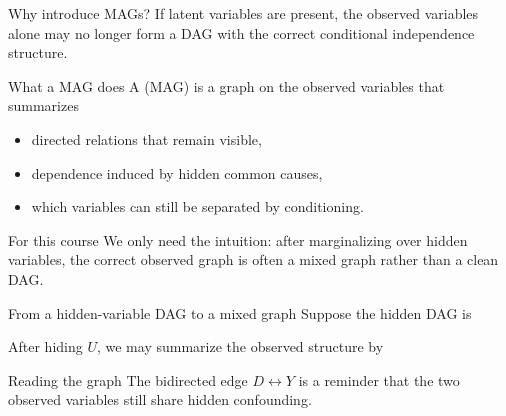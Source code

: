 \documentclass[dvipsnames,aspectratio=169,handout]{beamer}
\begin{document}
\begin{frame}{Why introduce MAGs?}
If latent variables are present, the observed variables alone may no longer form a DAG with the correct conditional independence structure.

\begin{block}{What a MAG does}
A  (MAG) is a graph on the observed variables that summarizes
\begin{itemize}
    \item directed relations that remain visible,
    \item dependence induced by hidden common causes,
    \item which variables can still be separated by conditioning.
\end{itemize}
\end{block}

\begin{alertblock}{For this course}
We only need the intuition: after marginalizing over hidden variables, the correct observed graph is often a mixed graph rather than a clean DAG.
\end{alertblock}
\end{frame}

\begin{frame}{From a hidden-variable DAG to a mixed graph}
Suppose the hidden DAG is

\begin{center}
\end{center}

After hiding $U$, we may summarize the observed structure by

\begin{center}
\end{center}

\begin{alertblock}{Reading the graph}
The bidirected edge $D \leftrightarrow Y$ is a reminder that the two observed variables still share hidden confounding.
\end{alertblock}
\end{frame}
\end{document}
